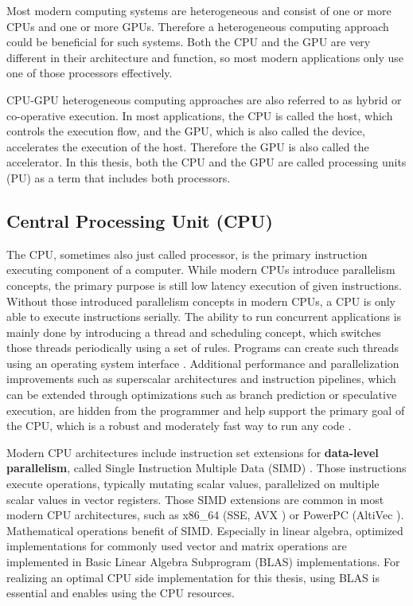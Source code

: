 Most modern computing systems are heterogeneous and consist of one or more CPUs and one or more GPUs. Therefore a heterogeneous computing approach could be beneficial for such systems. Both the CPU and the GPU are very different in their architecture and function, so most modern applications only use one of those processors effectively.

CPU-GPU heterogeneous computing approaches are also referred to as hybrid or co-operative execution. In most applications, the CPU is called the host, which controls the execution flow, and the GPU, which is also called the device, accelerates the execution of the host. Therefore the GPU is also called the accelerator. In this thesis, both the CPU and the GPU are called processing units (PU) as a term that includes both processors.

\subsection{Central Processing Unit (CPU)}
The CPU, sometimes also just called processor, is the primary instruction executing component of a computer. While modern CPUs introduce parallelism concepts, the primary purpose is still low latency execution of given instructions.
Without those introduced parallelism concepts in modern CPUs, a CPU is only able to execute instructions serially. The ability to run concurrent applications is mainly done by introducing a thread and scheduling concept, which switches those threads periodically using a set of rules. Programs can create such threads using an operating system interface \cite{nemirovskyMultithreadingArchitecture2013}.
Additional performance and parallelization improvements such as superscalar architectures and instruction pipelines, which can be extended through optimizations such as branch prediction or speculative execution, are hidden from the programmer and help support the primary goal of the CPU, which is a robust and moderately fast way to run any code \cite{johnsonSuperScalarProcessorDesign, falsafiPrimerHardwarePrefetching2014, smithStudyBranchPrediction1998}.

Modern CPU architectures include instruction set extensions for \textbf{data-level parallelism}, called Single Instruction Multiple Data (SIMD) \cite{barnesILLIACIVComputer1968,smartFullyHomomorphicSIMD2014, VectorExtensionsUsing}. Those instructions execute operations, typically mutating scalar values, parallelized on multiple scalar values in vector registers. Those SIMD extensions are common in most modern CPU architectures, such as x86\_64 (SSE, AVX \cite{IntelIntrinsicsGuide}) or PowerPC (AltiVec \cite{diefendorffAltiVecExtensionPowerPC2000}). Mathematical operations benefit of SIMD. Especially in linear algebra, optimized implementations for commonly used vector and matrix operations are implemented in Basic Linear Algebra Subprogram (BLAS) \cite{lawsonBasicLinearAlgebra1979} implementations. For realizing an optimal CPU side implementation for this thesis, using BLAS is essential and enables using the CPU resources.

